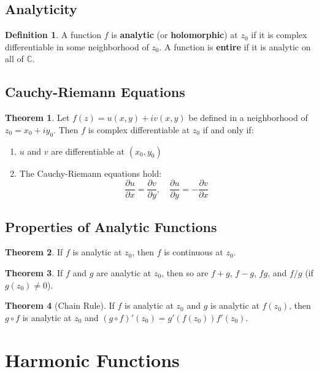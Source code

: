 \documentclass[11pt]{article}
\theoremstyle{definition}
\newtheorem{definition}{Definition}[section]
\newtheorem{theorem}{Theorem}[section]
\begin{document}
\subsection{Analyticity}
\begin{definition}
A function $f$ is \textbf{analytic} (or \textbf{holomorphic}) at $z_0$ if it is complex differentiable in some neighborhood of $z_0$. A function is \textbf{entire} if it is analytic on all of $\mathbb{C}$.
\end{definition}

\subsection{Cauchy-Riemann Equations}
\begin{theorem}
Let $f(z) = u(x,y) + iv(x,y)$ be defined in a neighborhood of $z_0 = x_0 + iy_0$. Then $f$ is complex differentiable at $z_0$ if and only if:
\begin{enumerate}
    \item $u$ and $v$ are differentiable at $(x_0, y_0)$
    \item The Cauchy-Riemann equations hold:
    $$\frac{\partial u}{\partial x} = \frac{\partial v}{\partial y}, \quad \frac{\partial u}{\partial y} = -\frac{\partial v}{\partial x}$$
\end{enumerate}
\end{theorem}

\subsection{Properties of Analytic Functions}
\begin{theorem}
If $f$ is analytic at $z_0$, then $f$ is continuous at $z_0$.
\end{theorem}

\begin{theorem}
If $f$ and $g$ are analytic at $z_0$, then so are $f + g$, $f - g$, $fg$, and $f/g$ (if $g(z_0) \neq 0$).
\end{theorem}

\begin{theorem}[Chain Rule]
If $f$ is analytic at $z_0$ and $g$ is analytic at $f(z_0)$, then $g \circ f$ is analytic at $z_0$ and $(g \circ f)'(z_0) = g'(f(z_0))f'(z_0)$.
\end{theorem}

\section{Harmonic Functions}
\end{document}

